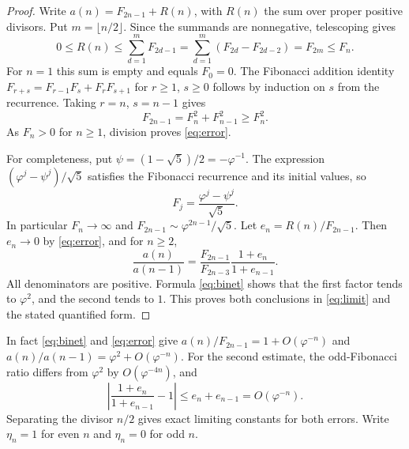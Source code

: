 \documentclass[11pt]{article}
\newcommand{\ph}{\varphi}
\begin{document}
\begin{proof}
Write $a(n)=F_{2n-1}+R(n)$, with $R(n)$ the sum over proper positive
divisors. Put $m=\lfloor n/2\rfloor$. Since the summands are
nonnegative, telescoping gives
\[
 0\leq R(n)\leq\sum_{d=1}^{m}F_{2d-1}
 =\sum_{d=1}^{m}(F_{2d}-F_{2d-2})=F_{2m}\leq F_n.
\]
For $n=1$ this sum is empty and equals $F_0=0$.
The Fibonacci addition identity
$F_{r+s}=F_{r-1}F_s+F_rF_{s+1}$ for $r\geq1$, $s\geq0$
follows by induction on $s$ from the recurrence. Taking $r=n$,
$s=n-1$ gives
\[
 F_{2n-1}=F_n^2+F_{n-1}^2\geq F_n^2.
\]
As $F_n>0$ for $n\geq1$, division proves \eqref{eq:error}.

For completeness, put $\psi=(1-\sqrt5)/2=-\ph^{-1}$. The expression
$(\ph^j-\psi^j)/\sqrt5$ satisfies the Fibonacci recurrence and its
initial values, so
\begin{equation}\label{eq:binet}
 F_j=\frac{\ph^j-\psi^j}{\sqrt5}.
\end{equation}
In particular $F_n\to\infty$ and
$F_{2n-1}\sim\ph^{2n-1}/\sqrt5$. Let
$e_n=R(n)/F_{2n-1}$. Then $e_n\to0$ by \eqref{eq:error}, and for
$n\geq2$,
\[
 \frac{a(n)}{a(n-1)}
 =\frac{F_{2n-1}}{F_{2n-3}}\frac{1+e_n}{1+e_{n-1}}.
\]
All denominators are positive. Formula \eqref{eq:binet} shows that the
first factor tends to $\ph^2$, and the second tends to $1$. This proves
both conclusions in \eqref{eq:limit} and the stated quantified form.
\end{proof}

In fact \eqref{eq:binet} and \eqref{eq:error} give
$a(n)/F_{2n-1}=1+O(\ph^{-n})$ and
$a(n)/a(n-1)=\ph^2+O(\ph^{-n})$.
For the second estimate, the odd-Fibonacci ratio differs from
$\ph^2$ by $O(\ph^{-4n})$, and
\[
 \left|\frac{1+e_n}{1+e_{n-1}}-1\right|
 \leq e_n+e_{n-1}=O(\ph^{-n}).
\]
Separating the divisor $n/2$ gives exact limiting constants for both
errors. Write $\eta_n=1$ for even $n$ and $\eta_n=0$ for odd $n$.
\end{document}
